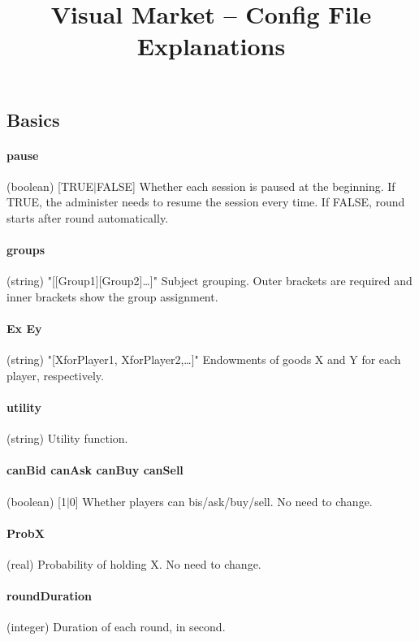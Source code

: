 \documentclass[12pt]{article}
\title{Visual Market -- Config File Explanations}
\begin{document}
\maketitle

\subsection*{Basics}

\paragraph{pause} (boolean) [TRUE$|$FALSE] Whether each session is paused at the beginning. If TRUE, the administer needs to resume the session every time. If FALSE, round starts after round automatically.

\paragraph{groups} (string) "[[Group1][Group2]\dots]" Subject grouping. Outer brackets are required and inner brackets show the group assignment.  

\paragraph{Ex Ey} (string) "[XforPlayer1, XforPlayer2,\dots]" Endowments of goods X and Y for each player, respectively.

\paragraph{utility} (string) Utility function.

\paragraph{canBid canAsk canBuy canSell}(boolean) [1$|$0] Whether players can bis/ask/buy/sell. No need to change.

\paragraph{ProbX} (real) Probability of holding X. No need to change.

\paragraph{roundDuration} (integer) Duration of each round, in second.
\end{document}
